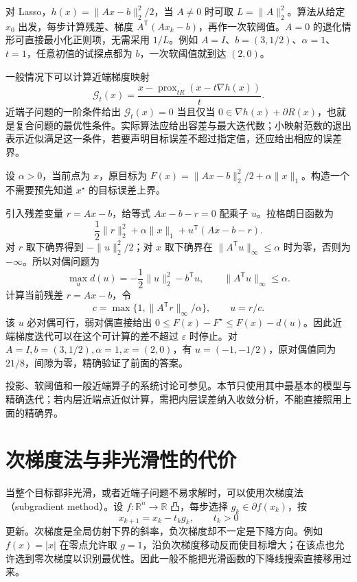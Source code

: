 \documentclass[UTF8,12pt,a4paper,fontset=fandol]{ctexbook}
\begin{document}
对 Lasso，$h(x)=\|Ax-b\|_2^2/2$，当 $A\ne0$ 时可取 $L=\|A\|_2^2$。算法从给定 $x_0$ 出发，每步计算残差、梯度 $A^{\mathsf T}(Ax_k-b)$，再作一次软阈值。$A=0$ 的退化情形可直接最小化正则项，无需采用 $1/L$。例如 $A=I$、$b=(3,1/2)$、$\alpha=1$、$t=1$，任意初值的试探点都为 $b$，一次软阈值就到达 $(2,0)$。

一般情况下可以计算近端梯度映射
\[
 \mathcal G_t(x)=\frac{x-\operatorname{prox}_{tR}(x-t\nabla h(x))}{t}.
\]
近端子问题的一阶条件给出 $\mathcal G_t(x)=0$ 当且仅当
$0\in\nabla h(x)+\partial R(x)$，也就是复合问题的最优性条件。实际算法应给出容差与最大迭代数；小映射范数的退出表示近似满足这一条件，若要声明目标误差不超过指定值，还应给出相应的误差界。

\begin{example}
设 $\alpha>0$，当前点为 $x$，原目标为 $F(x)=\|Ax-b\|_2^2/2+\alpha\|x\|_1$。构造一个不需要预先知道 $x^\star$ 的目标误差上界。
\end{example}
\begin{solve}
引入残差变量 $r=Ax-b$，给等式 $Ax-b-r=0$ 配乘子 $u$。拉格朗日函数为
\[
 \frac12\|r\|_2^2+\alpha\|x\|_1+u^{\mathsf T}(Ax-b-r).
\]
对 $r$ 取下确界得到 $-\|u\|_2^2/2$；对 $x$ 取下确界在 $\|A^{\mathsf T}u\|_\infty\leq\alpha$ 时为零，否则为 $-\infty$。所以对偶问题为
\[
 \max_u d(u)=-\frac12\|u\|_2^2-b^{\mathsf T}u,
 \qquad \|A^{\mathsf T}u\|_\infty\leq\alpha.
\]
计算当前残差 $r=Ax-b$，令
\[
 c=\max\{1,\|A^{\mathsf T}r\|_\infty/\alpha\},\qquad u=r/c.
\]
该 $u$ 必对偶可行，弱对偶直接给出 $0\leq F(x)-F^\star\leq F(x)-d(u)$。因此近端梯度迭代可以在这个可计算的差不超过 $\varepsilon$ 时停止。对 $A=I,b=(3,1/2),\alpha=1,x=(2,0)$，有 $u=(-1,-1/2)$，原对偶值同为 $21/8$，间隙为零，精确验证了前面的答案。
\end{solve}

投影、软阈值和一般近端算子的系统讨论可参见\cite{parikh-boyd}。本节只使用其中最基本的模型与精确迭代；若内层近端点近似计算，需把内层误差纳入收敛分析，不能直接照用上面的精确界。

\section{次梯度法与非光滑性的代价}
\label{sec:co-subgradient-method}

当整个目标都非光滑，或者近端子问题不易求解时，可以使用次梯度法（subgradient method）。设 $f:\mathbb R^n\to\mathbb R$ 凸，每步选择 $g_k\in\partial f(x_k)$，按
\[
 x_{k+1}=x_k-t_k g_k,\qquad t_k>0
\]
更新。次梯度是全局仿射下界的斜率，负次梯度却不一定是下降方向。例如 $f(x)=|x|$ 在零点允许取 $g=1$，沿负次梯度移动反而使目标增大；在该点也允许选到零次梯度以识别最优性。因此一般不能把光滑函数的下降线搜索直接移用过来。
\end{document}
